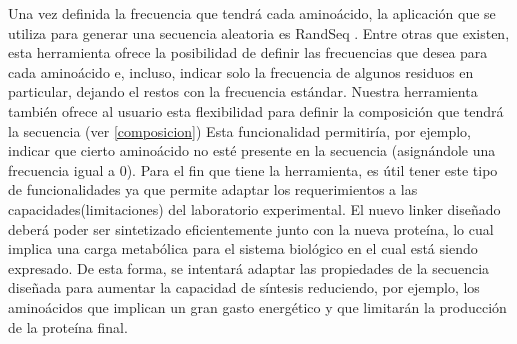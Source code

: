 
Una vez definida la frecuencia que tendrá cada aminoácido, la aplicación que se utiliza para generar una secuencia aleatoria es RandSeq \cite{randseq}.
Entre otras que existen, esta herramienta ofrece la posibilidad de definir las frecuencias que desea para cada aminoácido e, incluso,
indicar solo la frecuencia de algunos residuos en particular, dejando el restos con la frecuencia estándar. 
Nuestra herramienta también ofrece al usuario esta flexibilidad para definir la composición que tendrá la secuencia (ver \ref{composicion})
Esta funcionalidad permitiría, por ejemplo, indicar que cierto aminoácido no esté presente en la secuencia (asignándole una frecuencia igual a 0). 
Para el fin que tiene la herramienta, es útil tener este tipo de funcionalidades ya que permite adaptar los requerimientos a las capacidades(limitaciones) del laboratorio experimental. 
El nuevo linker diseñado deberá poder ser sintetizado eficientemente junto con la nueva proteína, lo cual implica una carga metabólica para el sistema biológico en el cual está siendo expresado. 
De esta forma, se intentará adaptar las propiedades de la secuencia diseñada para aumentar la capacidad de síntesis reduciendo, por ejemplo, los aminoácidos que implican un gran gasto energético
y que limitarán la producción de la proteína final.








